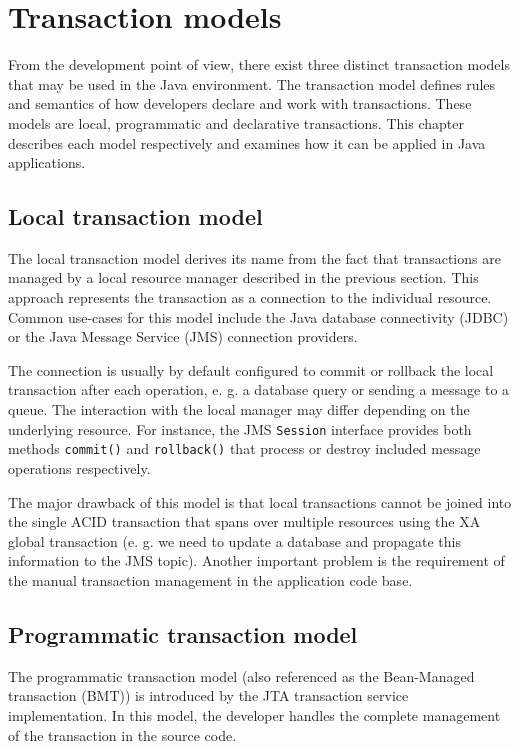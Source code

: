 \documentclass[oneside,
  digital, %
  table,   %
  nolof,     %
  nolot,     %
]{fithesis3}
\begin{document}
\section{Transaction models}

From the development point of view, there exist three distinct transaction models that may be used in the Java environment. The transaction model defines rules and semantics of how developers declare and work with transactions. These models are local, programmatic and declarative transactions. This chapter describes each model respectively and examines how it can be applied in Java applications.

\subsection{Local transaction model}

The local transaction model derives its name from the fact that transactions are managed by a local resource manager described in the previous section. This approach represents the transaction as a connection to the individual resource. Common use-cases for this model include the Java database connectivity (JDBC) or the Java Message Service (JMS) connection providers.

The connection is usually by default configured to commit or rollback the local transaction after each operation, e. g. a database query or sending a message to a queue. The interaction with the local manager may differ depending on the underlying resource. For instance, the JMS \texttt{Session} interface provides both methods \texttt{commit()} and \texttt{rollback()} that process or destroy included message operations respectively.

The major drawback of this model is that local transactions cannot be joined into the single ACID transaction that spans over multiple resources using the XA global transaction \cite{java_transaction_design_strategies} (e. g. we need to update a database and propagate this information to the JMS topic). Another important problem is the requirement of the manual transaction management in the application code base.

\subsection{Programmatic transaction model}

The programmatic transaction model (also referenced as the Bean-Managed transaction (BMT)) is introduced by the JTA transaction service implementation. In this model, the developer handles the complete management of the transaction in the source code.
\end{document}
